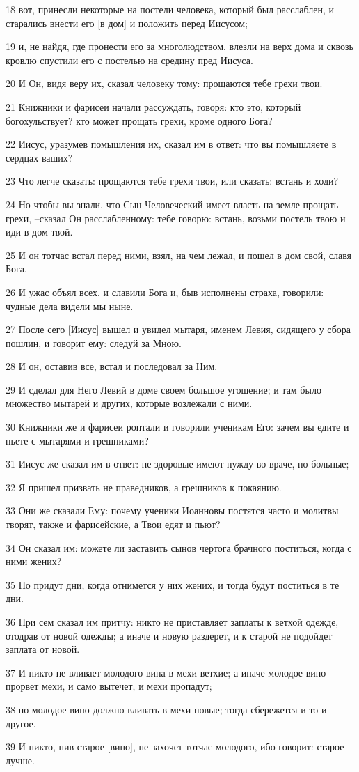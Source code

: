 \par 18 вот, принесли некоторые на постели человека, который был расслаблен, и старались внести его [в дом] и положить перед Иисусом;
\par 19 и, не найдя, где пронести его за многолюдством, влезли на верх дома и сквозь кровлю спустили его с постелью на средину пред Иисуса.
\par 20 И Он, видя веру их, сказал человеку тому: прощаются тебе грехи твои.
\par 21 Книжники и фарисеи начали рассуждать, говоря: кто это, который богохульствует? кто может прощать грехи, кроме одного Бога?
\par 22 Иисус, уразумев помышления их, сказал им в ответ: что вы помышляете в сердцах ваших?
\par 23 Что легче сказать: прощаются тебе грехи твои, или сказать: встань и ходи?
\par 24 Но чтобы вы знали, что Сын Человеческий имеет власть на земле прощать грехи, --сказал Он расслабленному: тебе говорю: встань, возьми постель твою и иди в дом твой.
\par 25 И он тотчас встал перед ними, взял, на чем лежал, и пошел в дом свой, славя Бога.
\par 26 И ужас объял всех, и славили Бога и, быв исполнены страха, говорили: чудные дела видели мы ныне.
\par 27 После сего [Иисус] вышел и увидел мытаря, именем Левия, сидящего у сбора пошлин, и говорит ему: следуй за Мною.
\par 28 И он, оставив все, встал и последовал за Ним.
\par 29 И сделал для Него Левий в доме своем большое угощение; и там было множество мытарей и других, которые возлежали с ними.
\par 30 Книжники же и фарисеи роптали и говорили ученикам Его: зачем вы едите и пьете с мытарями и грешниками?
\par 31 Иисус же сказал им в ответ: не здоровые имеют нужду во враче, но больные;
\par 32 Я пришел призвать не праведников, а грешников к покаянию.
\par 33 Они же сказали Ему: почему ученики Иоанновы постятся часто и молитвы творят, также и фарисейские, а Твои едят и пьют?
\par 34 Он сказал им: можете ли заставить сынов чертога брачного поститься, когда с ними жених?
\par 35 Но придут дни, когда отнимется у них жених, и тогда будут поститься в те дни.
\par 36 При сем сказал им притчу: никто не приставляет заплаты к ветхой одежде, отодрав от новой одежды; а иначе и новую раздерет, и к старой не подойдет заплата от новой.
\par 37 И никто не вливает молодого вина в мехи ветхие; а иначе молодое вино прорвет мехи, и само вытечет, и мехи пропадут;
\par 38 но молодое вино должно вливать в мехи новые; тогда сбережется и то и другое.
\par 39 И никто, пив старое [вино], не захочет тотчас молодого, ибо говорит: старое лучше.

